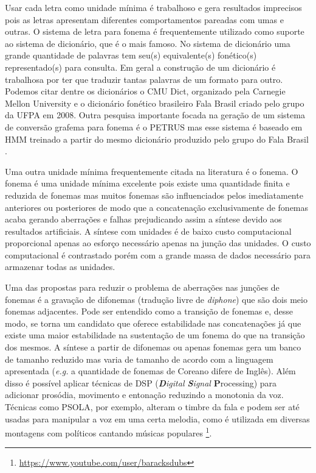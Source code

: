 Usar cada letra como unidade mínima é trabalhoso e gera resultados imprecisos pois as letras apresentam diferentes comportamentos pareadas com umas e outras. O sistema de letra para fonema é frequentemente utilizado como suporte ao sistema de dicionário, que é o mais famoso. No sistema de dicionário uma grande quantidade de palavras tem seu(s) equivalente(s) fonético(s) representado(s) para consulta. Em geral a construção de um dicionário é trabalhosa por ter que traduzir tantas palavras de um formato para outro. Podemos citar dentre os dicionários o CMU Dict, organizado pela Carnegie Mellon University \cite{cmudict} e o dicionário fonético brasileiro Fala Brasil \cite{falabrasil} criado pelo grupo da UFPA em 2008. Outra pesquisa importante focada na geração de um sistema de conversão grafema para fonema é o PETRUS \cite{petrus} mas esse sistema é baseado em HMM treinado a partir do mesmo dicionário produzido pelo grupo do Fala Brasil \cite{hmm}.

Uma outra unidade mínima frequentemente citada na literatura é o fonema. O fonema é uma unidade mínima excelente pois existe uma quantidade finita e reduzida de fonemas mas muitos fonemas são influenciados pelos imediatamente anteriores ou posteriores de modo que a concatenação exclusivamente de fonemas acaba gerando aberrações e falhas prejudicando assim a síntese devido aos resultados artificiais. A síntese com unidades é de baixo custo computacional proporcional apenas ao esforço necessário apenas na junção das unidades. O custo computacional é contrastado porém com a grande massa de dados necessário para armazenar todas as unidades.


Uma das propostas para reduzir o problema de aberrações nas junções de fonemas é a gravação de difonemas (tradução livre de \textit{diphone}) que são dois meio fonemas adjacentes. Pode ser entendido como a transição de fonemas e, desse modo, se torna um candidato que oferece estabilidade nas concatenações já que existe uma maior estabilidade na sustentação de um fonema do que na transição dos mesmos. A síntese a partir de difonemas ou apenas fonemas gera um banco de tamanho reduzido mas varia de tamanho de acordo com a linguagem apresentada (\textit{e.g.} a quantidade de fonemas de Coreano difere de Inglês). Além disso é possível aplicar técnicas de DSP (\textit{\textbf{D}igital \textbf{S}ignal} \textbf{P}rocessing) para adicionar prosódia, movimento e entonação reduzindo a monotonia da voz. Técnicas como PSOLA, por exemplo, alteram o timbre da fala e podem ser até usadas para manipular a voz em uma certa melodia, como é utilizada em diversas montagens com políticos cantando músicas populares \footnote{\href{https://www.youtube.com/user/baracksdubs}{https://www.youtube.com/user/baracksdubs}}.

